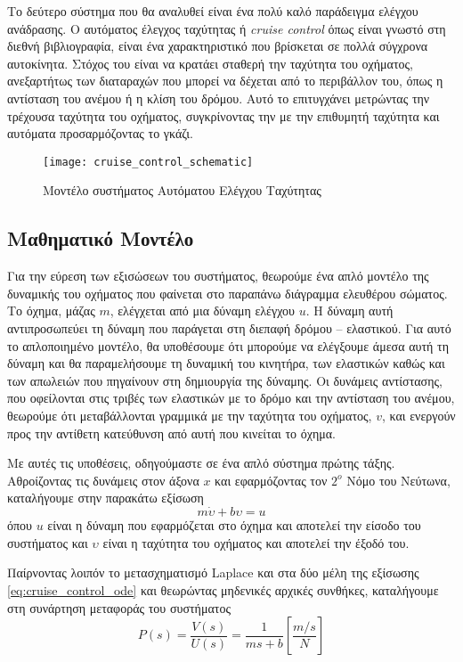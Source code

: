 Το δεύτερο σύστημα που θα αναλυθεί είναι ένα πολύ καλό παράδειγμα ελέγχου ανάδρασης. Ο αυτόματος έλεγχος ταχύτητας ή \emph{cruise control} όπως είναι γνωστό στη διεθνή βιβλιογραφία, είναι ένα χαρακτηριστικό που βρίσκεται σε πολλά σύγχρονα αυτοκίνητα. Στόχος του είναι να κρατάει σταθερή την ταχύτητα του οχήματος, ανεξαρτήτως των διαταραχών που μπορεί να δέχεται από το περιβάλλον του, όπως η αντίσταση του ανέμου ή η κλίση του δρόμου. Αυτό το επιτυγχάνει μετρώντας την τρέχουσα ταχύτητα του οχήματος, συγκρίνοντας την με την επιθυμητή ταχύτητα και αυτόματα προσαρμόζοντας το γκάζι.

\begin{figure}[h]
  \centering
  \texttt{[image: cruise\_control\_schematic]}
  \caption{Μοντέλο συστήματος Αυτόματου Ελέγχου Ταχύτητας}
  \label{fig:cruise_control_schematic}
\end{figure}

\subsection{Μαθηματικό Μοντέλο}

Για την εύρεση των εξισώσεων του συστήματος, θεωρούμε ένα απλό μοντέλο της δυναμικής του οχήματος που φαίνεται στο παραπάνω διάγραμμα ελευθέρου σώματος. Το όχημα, μάζας $m$, ελέγχεται από μια δύναμη ελέγχου $u$. Η δύναμη αυτή αντιπροσωπεύει τη δύναμη που παράγεται στη διεπαφή δρόμου  --  ελαστικού. Για αυτό το απλοποιημένο μοντέλο, θα υποθέσουμε ότι μπορούμε να ελέγξουμε άμεσα αυτή τη δύναμη και θα παραμελήσουμε τη δυναμική του κινητήρα, των ελαστικών καθώς και των απωλειών που πηγαίνουν στη δημιουργία της δύναμης. Οι δυνάμεις αντίστασης, που οφείλονται στις τριβές των ελαστικών με το δρόμο και την αντίσταση του ανέμου, θεωρούμε ότι μεταβάλλονται γραμμικά με την ταχύτητα του οχήματος, $v$, και ενεργούν προς την αντίθετη κατεύθυνση από αυτή που κινείται το όχημα.

Με αυτές τις υποθέσεις, οδηγούμαστε σε ένα απλό σύστημα πρώτης τάξης. Αθροίζοντας τις δυνάμεις στον άξονα $x$ και εφαρμόζοντας τον $2^o$ Νόμο του Νεύτωνα, καταλήγουμε στην παρακάτω εξίσωση
\begin{equation}
m\dot{\upsilon} + b\upsilon = u
\label{eq:cruise_control_ode}
\end{equation}
όπου $u$ είναι η δύναμη που εφαρμόζεται στο όχημα και αποτελεί την είσοδο του συστήματος και $\upsilon$ είναι η ταχύτητα του οχήματος και αποτελεί την έξοδό του.

Παίρνοντας λοιπόν το μετασχηματισμό Laplace και στα δύο μέλη της εξίσωσης \ref{eq:cruise_control_ode} και θεωρώντας μηδενικές αρχικές συνθήκες, καταλήγουμε στη συνάρτηση μεταφοράς του συστήματος
\begin{equation}
P(s) = \frac{V(s)}{U(s)} = \frac{1}{ms+b} \left[\frac{m/s}{N}\right]
\label{eq:cruise_control_laplace}
\end{equation}

